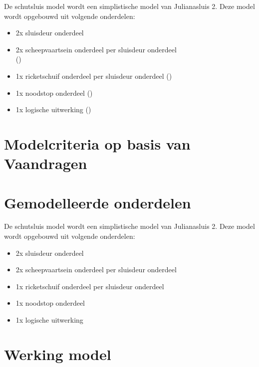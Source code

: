 \documentclass{article}
\begin{document}
    De schutsluis model wordt een simplistische model van Julianasluis 2. Deze model
    wordt opgebouwd uit volgende onderdelen:
    
    \begin{itemize}
        \item 2x sluisdeur onderdeel \\ 
        \item 2x scheepvaartsein onderdeel per sluisdeur onderdeel \\ (\textit{})
        \item 1x ricketschuif onderdeel per sluisdeur onderdeel (\textit{})
        \item 1x noodstop onderdeel (\textit{})
        \item 1x logische uitwerking (\textit{})
    \end{itemize}




\section {Modelcriteria op basis van Vaandragen}



\section {Gemodelleerde onderdelen}
    De schutsluis model wordt een simplistische model van Julianasluis 2. Deze model
    wordt opgebouwd uit volgende onderdelen:

    \begin{itemize}
        \item 2x sluisdeur onderdeel
        \item 2x scheepvaartsein onderdeel per sluisdeur onderdeel
        \item 1x ricketschuif onderdeel per sluisdeur onderdeel
        \item 1x noodstop onderdeel
        \item 1x logische uitwerking
    \end{itemize}




\section {Werking model}
\end{document}
